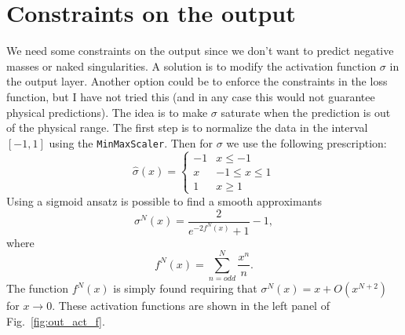\documentclass[prd,aps,twocolumn,a4paper,showkeys,nofootinbib]{revtex4-1}
\begin{document}
\section{Constraints on the output}
\label{sec:constraints}
We need some constraints on the output since we don't want to predict negative masses 
or naked singularities. A solution is to modify the activation function 
$\sigma$ in the output layer.
Another option could be to enforce the constraints in the loss function, but I have not tried this
(and in any case this would not guarantee physical predictions). 
The idea is to make $\sigma$ saturate when the prediction is out of the physical range. 
The first step is to normalize the data in the interval $[-1,1]$ using the \texttt{MinMaxScaler}.
Then for $\sigma$ we use the following prescription:
\begin{equation}
\hat{\sigma}(x) = \begin{cases} 
      -1 & x\leq -1 \\
      x & -1\leq x\leq 1 \\
      1 & x \geq 1 
\end{cases}
\end{equation}
Using a sigmoid ansatz is possible to find a smooth approximants
\begin{equation}
\sigma^N(x)  = \frac{2}{e^{-2 f^N(x)}+1}-1,
\end{equation}
where 
\begin{equation}
f^N(x)  = \sum_{n=odd}^{N} \frac{x^{n}}{n}.
\end{equation}
The function $f^N(x)$ is  simply found requiring that $\sigma^N(x)=x+O(x^{N+2})$ 
for $x\rightarrow 0$.
These activation functions are shown in the left panel of Fig.~\ref{fig:out_act_f}.
%
\end{document}
